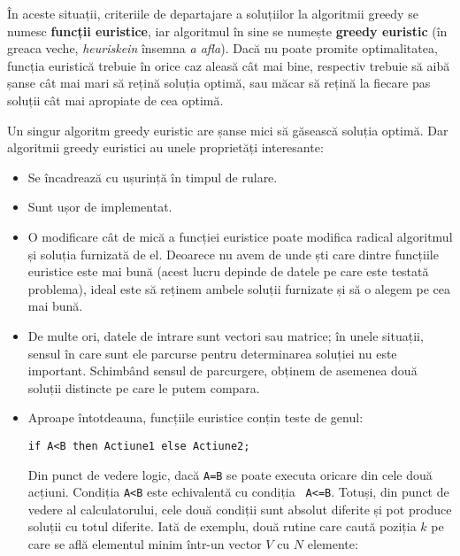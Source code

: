 În aceste situații, criteriile de departajare a soluțiilor la algoritmii
greedy se numesc {\bf funcții euristice}, iar algoritmul în sine se numește
{\bf greedy euristic} (în greaca veche, {\it heuriskein} însemna {\it a
  afla}). Dacă nu poate promite optimalitatea, funcția euristică trebuie în
orice caz aleasă cât mai bine, respectiv trebuie să aibă șanse cât mai mari să
rețină soluția optimă, sau măcar să rețină la fiecare pas soluții cât mai
apropiate de cea optimă.

Un singur algoritm greedy euristic are șanse mici să găsească soluția
optimă. Dar algoritmii greedy euristici au unele proprietăți interesante:

\begin{itemize}

\item Se încadrează cu ușurință în timpul de rulare.

\item Sunt ușor de implementat.

\item O modificare cât de mică a funcției euristice poate modifica radical
  algoritmul și soluția furnizată de el. Deoarece nu avem de unde ști care
  dintre funcțiile euristice este mai bună (acest lucru depinde de datele pe
  care este testată problema), ideal este să reținem ambele soluții furnizate
  și să o alegem pe cea mai bună.

\item De multe ori, datele de intrare sunt vectori sau matrice; în unele
  situații, sensul în care sunt ele parcurse pentru determinarea soluției nu
  este important. Schimbând sensul de parcurgere, obținem de asemenea două
  soluții distincte pe care le putem compara.

\item Aproape întotdeauna, funcțiile euristice conțin teste de genul:

\begin{verbatim}
if A<B then Actiune1 else Actiune2;
\end{verbatim}

Din punct de vedere logic, dacă {\tt A=B} se poate executa oricare din cele
două acțiuni. Condiția {\tt A<B} este echivalentă cu condiția {\tt
  A<=B}. Totuși, din punct de vedere al calculatorului, cele două condiții
sunt absolut diferite și pot produce soluții cu totul diferite. Iată de
exemplu, două rutine care caută poziția $k$ pe care se află elementul minim
într-un vector $V$ cu $N$ elemente:


\end{itemize}
